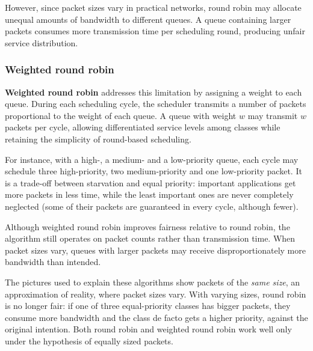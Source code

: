 However, since packet sizes vary in practical networks, round robin may allocate unequal amounts of bandwidth to different queues. A queue containing larger packets consumes more transmission time per scheduling round, producing unfair service distribution.

\subsubsection*{Weighted round robin}

\textbf{Weighted round robin} addresses this limitation by assigning a weight to each queue. During each scheduling cycle, the scheduler transmits a number of packets proportional to the weight of each queue. A queue with weight $w$ may transmit $w$ packets per cycle, allowing differentiated service levels among classes while retaining the simplicity of round-based scheduling.

For instance, with a high-, a medium- and a low-priority queue, each cycle may schedule three high-priority, two medium-priority and one low-priority packet. It is a trade-off between starvation and equal priority: important applications get more packets in less time, while the least important ones are never completely neglected (some of their packets are guaranteed in every cycle, although fewer).

\begin{center}
\end{center}


Although weighted round robin improves fairness relative to round robin, the algorithm still operates on packet counts rather than transmission time. When packet sizes vary, queues with larger packets may receive disproportionately more bandwidth than intended.

The pictures used to explain these algorithms show packets of the \emph{same size}, an approximation of reality, where packet sizes vary. With varying sizes, round robin is no longer fair: if one of three equal-priority classes has bigger packets, they consume more bandwidth and the class de facto gets a higher priority, against the original intention. Both round robin and weighted round robin work well only under the hypothesis of equally sized packets.


\begin{center}
\end{center}

